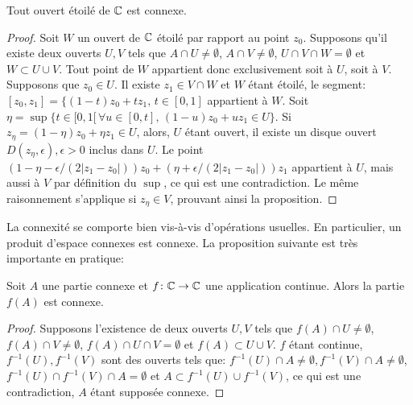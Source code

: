 \begin{fprop}
Tout ouvert étoilé de $\mathbb{C}$ est connexe.
\end{fprop}
\begin{proof}
Soit $W$ un ouvert de $\mathbb{C}$ étoilé par rapport au point $z_0$. Supposons qu'il existe deux ouverts $U,V$ tels que $A\cap U \neq \emptyset$, $A \cap V \neq \emptyset$, $U \cap V \cap W = \emptyset$ et $W \subset U \cup V$. Tout point de $W$ appartient donc exclusivement soit à $U$, soit à $V$. Supposons que $z_0 \in U$. Il existe $z_1 \in V \cap W$ et $W$ étant étoilé, le segment: $[z_0,z_1] = \{ (1-t)z_0 + t z_1, \, t \in [0,1]$ appartient à $W$. Soit $\eta = \sup \{ t \in [0,1[ \, \forall u \in [0,t], \,(1-u)z_0 + u z_1 \in U\}$. Si $z_\eta = (1-\eta)z_0 + \eta z_1 \in U$, alors, $U$ étant ouvert, il existe un disque ouvert $D(z_\eta, \epsilon), \epsilon > 0$ inclus dans $U$. Le point $(1-\eta-\epsilon/(2|z_1-z_0|))z_0 + (\eta + \epsilon / (2|z_1-z_0|))z_1$ appartient à $U$, mais aussi à $V$ par définition du $\sup$, ce qui est une contradiction. Le même raisonnement s'applique si $z_\eta \in V$, prouvant ainsi la proposition. 
\end{proof}
La connexité se comporte bien vis-à-vis d'opérations usuelles. En particulier, un produit d'espace connexes est connexe. La proposition suivante est très importante en pratique:
\begin{fprop}
Soit $A$ une partie connexe et $f \colon \mathbb{C} \to \mathbb{C}$ une application continue. Alors la partie $f(A)$ est connexe.
\end{fprop}
\begin{proof}
Supposons l'existence de deux ouverts $U,V$ tels que $f(A)\cap U \neq \emptyset$,$f(A)\cap V \neq \emptyset$, $f(A)\cap U\cap V = \emptyset$ et $f(A) \subset U \cup V$. $f$ étant continue, $f^{-1}(U), f^{-1}(V)$ sont des ouverts tels que: $f^{-1}(U)\cap A \neq \emptyset, f^{-1}(V)\cap A \neq \emptyset$, $f^{-1}(U)\cap f^{-1}(V)\cap A = \emptyset$ et $A \subset f^{-1}(U)\cup f^{-1}(V)$, ce qui est une contradiction, $A$ étant supposée connexe. 
\end{proof}

